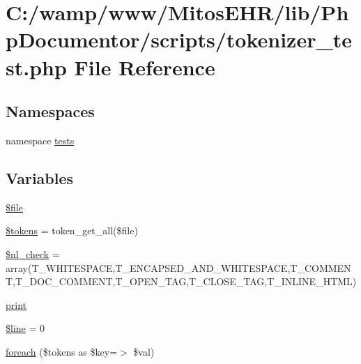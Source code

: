 \hypertarget{tokenizer__test_8php}{\section{\-C\-:/wamp/www/\-Mitos\-E\-H\-R/lib/\-Php\-Documentor/scripts/tokenizer\-\_\-test.php \-File \-Reference}
\label{tokenizer__test_8php}
}
\subsection*{\-Namespaces}
\begin{DoxyCompactItemize}
\item 
namespace \hyperlink{namespacetests}{tests}
\end{DoxyCompactItemize}
\subsection*{\-Variables}
\begin{DoxyCompactItemize}
\item 
\hyperlink{tokenizer__test_8php_aa1bfbd27060176201b271918dff57e8f}{\$file}
\item 
\hyperlink{tokenizer__test_8php_a72ead29e4317fbc4335fd3ba764e8b59}{\$tokens} = token\-\_\-get\-\_\-all(\$file)
\item 
\hyperlink{tokenizer__test_8php_a906bfa5b99948cfe33ed4aaf8902a00f}{\$nl\-\_\-check} = array(\-T\-\_\-\-W\-H\-I\-T\-E\-S\-P\-A\-C\-E,\-T\-\_\-\-E\-N\-C\-A\-P\-S\-E\-D\-\_\-\-A\-N\-D\-\_\-\-W\-H\-I\-T\-E\-S\-P\-A\-C\-E,\-T\-\_\-\-C\-O\-M\-M\-E\-N\-T,\-T\-\_\-\-D\-O\-C\-\_\-\-C\-O\-M\-M\-E\-N\-T,\-T\-\_\-\-O\-P\-E\-N\-\_\-\-T\-A\-G,\-T\-\_\-\-C\-L\-O\-S\-E\-\_\-\-T\-A\-G,\-T\-\_\-\-I\-N\-L\-I\-N\-E\-\_\-\-H\-T\-M\-L)
\item 
\hyperlink{tokenizer__test_8php_a3ad3a4240c0f97c7e85aff5c52a454d4}{print}
\item 
\hyperlink{tokenizer__test_8php_a52f469b0182d9abac2d0f20548680c9c}{\$line} = 0
\item 
\hyperlink{tokenizer__test_8php_abda7d0bba3f9720b725f14f620cd4fd6}{foreach} (\$tokens as \$key=$>$ \$val)
\end{DoxyCompactItemize}


